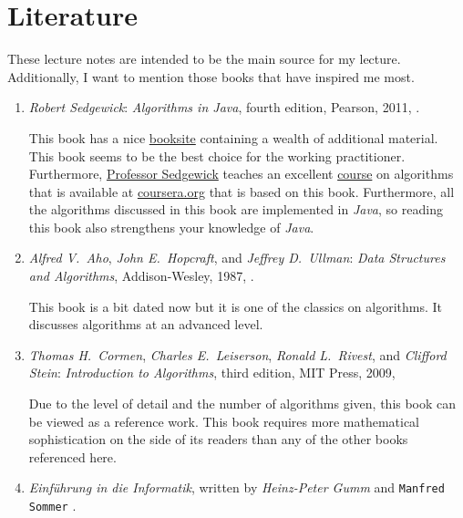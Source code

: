 \section{Literature}
These lecture notes are intended to be the main source for my lecture.  Additionally, I want
to mention those books that have inspired me most.
\begin{enumerate}
\item \textsl{Robert Sedgewick}: \emph{Algorithms in \textsl{Java}}, 
      fourth edition, Pearson, 2011, \cite{sedgewick:11}.
    
      This book has a nice \href{http://algs4.cs.princeton.edu/home/}{booksite} containing a wealth
      of additional material.  This book seems to be the best choice for the working practitioner.
      Furthermore, \href{http://www.cs.princeton.edu/~rs/}{Professor Sedgewick} teaches an excellent 
      \href{https://www.coursera.org/course/algs4partI}{course} on algorithms that is available at
      \href{https://www.coursera.org/}{coursera.org} that is based on this book.  Furthermore, all
      the algorithms discussed in this book are implemented in \textsl{Java}, so reading this book
      also strengthens your knowledge of \textsl{Java}.
\item \textsl{Alfred V.~Aho}, \textsl{John E.~Hopcraft}, and \textsl{Jeffrey D.~Ullman}:
      \emph{Data Structures and Algorithms}, Addison-Wesley, 1987, \cite{aho:87}.
      
      This book is a bit dated now but it is one of the classics on algorithms.  It discusses algorithms at an
      advanced level.
\item \textsl{Thomas H.~Cormen}, \textsl{Charles E.~Leiserson}, 
      \textsl{Ronald L.~Rivest}, and \textsl{Clifford Stein}:
      \emph{Introduction to Algorithms}, 
      third edition, MIT Press, 2009, \cite{cormen:09}

      Due to the level of detail and the number of algorithms given, this book can be viewed as a reference work.
      This book requires more mathematical sophistication on the side of its readers than any of the
      other books referenced here.  
\item \emph{Einf\"uhrung in die Informatik},
      written by \textsl{Heinz-Peter Gumm} and \texttt{Manfred Sommer} \cite{gumm:2008}.
      

\end{enumerate}
